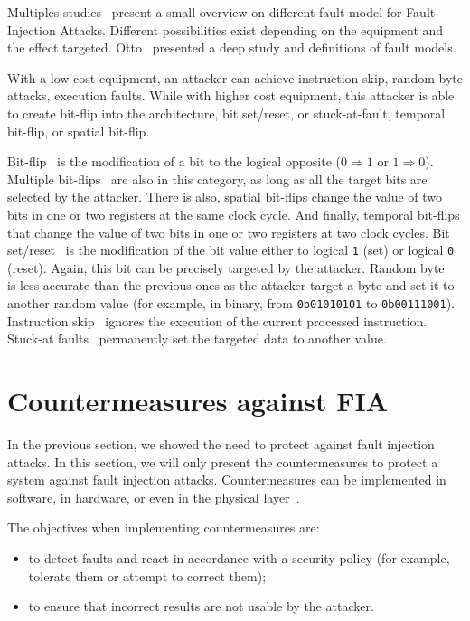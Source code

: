Multiples studies~\cite{BH-22-access,GMA-22-electronics,KSV-13-tvlsi,ZAV-06-jarab,YSW-18-hss} present a small overview on different fault model for Fault Injection Attacks. Different possibilities exist depending on the equipment and the effect targeted. Otto~\cite{O-05-phd} presented a deep study and definitions of fault models.

With a low-cost equipment, an attacker can achieve instruction skip, random byte attacks, execution faults. While with higher cost equipment, this attacker is able to create bit-flip into the architecture, bit set/reset, or stuck-at-fault, temporal bit-flip, or spatial bit-flip.

Bit-flip~\cite{CMDMRD-19-host} is the modification of a bit to the logical opposite ($0 \Rightarrow 1$ or $1 \Rightarrow 0$).
Multiple bit-flips~\cite{CGVCBLC-22-cardis} are also in this category, as long as all the target bits are selected by the attacker.
There is also, spatial bit-flips change the value of two bits in one or two registers at the same clock cycle.
And finally, temporal bit-flips that change the value of two bits in one or two registers at two clock cycles.
Bit set/reset~\cite{BS-03-financialcrypto} is the modification of the bit value either to logical \texttt{1} (set) or logical \texttt{0} (reset). Again, this bit can be precisely targeted by the attacker.
Random byte~\cite{LFZD-16-fdtc} is less accurate than the previous ones as the attacker target a byte and set it to another random value (for example, in binary, from \texttt{0b01010101} to \texttt{0b00111001}).
Instruction skip~\cite{MDPRD-20-dtis} ignores the execution of the current processed instruction.
Stuck-at faults~\cite{MABGHMRSYV-18-fdtc} permanently set the targeted data to another value.


\section{Countermeasures against FIA}
\label{section:countermeasuresAgainstFIA}
In the previous section, we showed the need to protect against fault injection attacks.
In this section, we will only present the countermeasures to protect a system against fault injection attacks.
Countermeasures can be implemented in software, in hardware, or even in the physical layer~\cite{BCNTW-06-procieee}.

The objectives when implementing countermeasures are:
\begin{itemize}
    \item to detect faults and react in accordance with a security policy (for example, tolerate them or attempt to correct them);
    \item to ensure that incorrect results are not usable by the attacker. 
\end{itemize}

